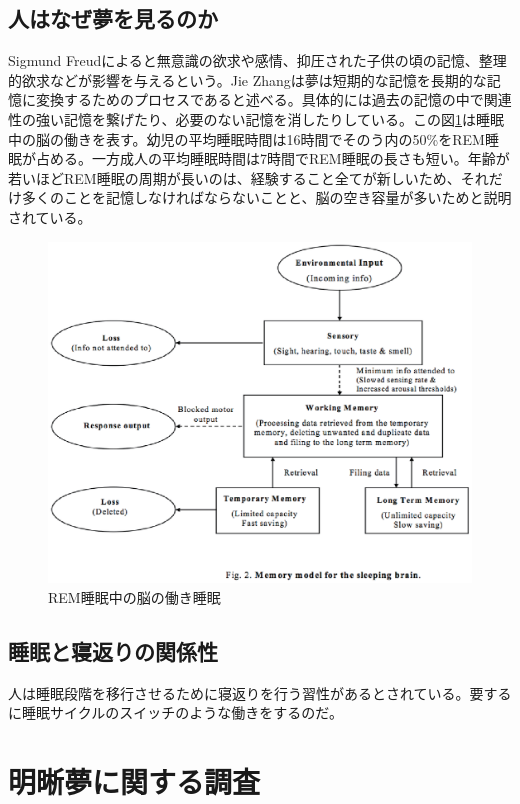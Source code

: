 \subsection{人はなぜ夢を見るのか}
Sigmund Freudによると無意識の欲求や感情、抑圧された子供の頃の記憶、整理的欲求などが影響を与えるという\cite{freud}。Jie Zhangは夢は短期的な記憶を長期的な記憶に変換するためのプロセスであると述べる。具体的には過去の記憶の中で関連性の強い記憶を繋げたり、必要のない記憶を消したりしている\cite{Zhang}。この図\ref{brainZhang}は睡眠中の脳の働きを表す。幼児の平均睡眠時間は16時間でそのう内の50\%をREM睡眠が占める。一方成人の平均睡眠時間は7時間でREM睡眠の長さも短い。年齢が若いほどREM睡眠の周期が長いのは、経験すること全てが新しいため、それだけ多くのことを記憶しなければならないことと、脳の空き容量が多いためと説明されている。

\begin{figure}[htbp]
\begin{center}
\includegraphics[width=15cm]{eps/sleepBrainModel.eps}
\caption{REM睡眠中の脳の働き睡眠}
\label{brainZhang}
\end{center}
\end{figure}

\subsection{睡眠と寝返りの関係性}
人は睡眠段階を移行させるために寝返りを行う習性があるとされている。要するに睡眠サイクルのスイッチのような働きをするのだ。\cite{negaeri}

\section{明晰夢に関する調査}
